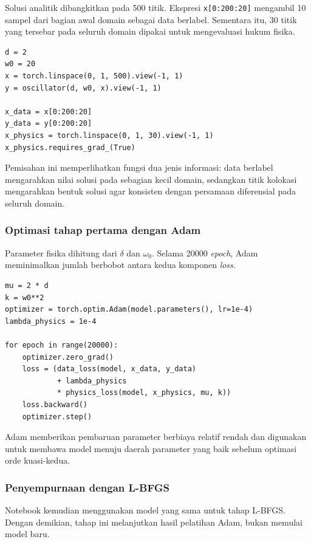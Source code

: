 \documentclass[12pt, letterpaper]{article}
\begin{document}
Solusi analitik dibangkitkan pada 500 titik. Ekspresi
\texttt{x[0:200:20]} mengambil 10 sampel dari bagian awal domain sebagai data
berlabel. Sementara itu, 30 titik yang tersebar pada seluruh domain dipakai
untuk mengevaluasi hukum fisika.

\begin{lstlisting}[caption={Data berlabel dan titik kolokasi osilator}]
d = 2
w0 = 20
x = torch.linspace(0, 1, 500).view(-1, 1)
y = oscillator(d, w0, x).view(-1, 1)

x_data = x[0:200:20]
y_data = y[0:200:20]
x_physics = torch.linspace(0, 1, 30).view(-1, 1)
x_physics.requires_grad_(True)
\end{lstlisting}

Pemisahan ini memperlihatkan fungsi dua jenis informasi: data berlabel
mengarahkan nilai solusi pada sebagian kecil domain, sedangkan titik kolokasi
mengarahkan bentuk solusi agar konsisten dengan persamaan diferensial pada
seluruh domain.

\subsubsection{Optimasi tahap pertama dengan Adam}

Parameter fisika dihitung dari $\delta$ dan $\omega_0$. Selama 20000
\textit{epoch}, Adam meminimalkan jumlah berbobot antara kedua komponen
\textit{loss}.

\begin{lstlisting}[caption={Pelatihan awal menggunakan Adam}]
mu = 2 * d
k = w0**2
optimizer = torch.optim.Adam(model.parameters(), lr=1e-4)
lambda_physics = 1e-4

for epoch in range(20000):
    optimizer.zero_grad()
    loss = (data_loss(model, x_data, y_data)
            + lambda_physics
            * physics_loss(model, x_physics, mu, k))
    loss.backward()
    optimizer.step()
\end{lstlisting}

Adam memberikan pembaruan parameter berbiaya relatif rendah dan digunakan
untuk membawa model menuju daerah parameter yang baik sebelum optimasi orde
kuasi-kedua.

\subsubsection{Penyempurnaan dengan L-BFGS}

Notebook kemudian menggunakan model yang sama untuk tahap L-BFGS. Dengan
demikian, tahap ini melanjutkan hasil pelatihan Adam, bukan memulai model baru.
\end{document}
